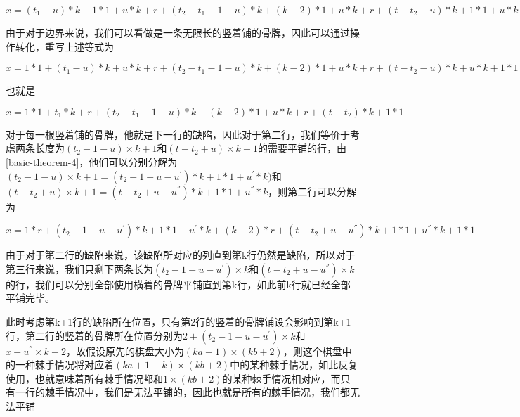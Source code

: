 $x = (t_1 - u) * k  + 1 * 1 + u * k + r +  (t_2 - t_1 - 1 - u) * k  + (k - 2) * 1 + u * k + r + (t - t_2 - u) * k  + 1 * 1 + u * k$

由于对于边界来说，我们可以看做是一条无限长的竖着铺的骨牌，因此可以通过操作转化，重写上述等式为

$x =  1 * 1 +  (t_1 - u) * k  + u * k + r +  (t_2 - t_1 - 1 - u) * k  + (k - 2) * 1 + u * k + r + (t - t_2 - u) * k  + u * k + 1 * 1$

也就是

$x =  1 * 1 +  t_1 * k + r +  (t_2 - t_1 - 1 - u) * k  + (k - 2) * 1 + u * k + r + (t - t_2) * k + 1 * 1$

对于每一根竖着铺的骨牌，他就是下一行的缺陷，因此对于第二行，我们等价于考虑两条长度为$(t_2- 1 - u) \times k + 1$和$(t - t_2 + u) \times k + 1$的需要平铺的行，由\ref*{basic-theorem-4}，他们可以分别分解为$(t_2- 1 - u) \times k + 1 = (t_2- 1 - u - u^{'}) * k + 1* 1 +  u^{'} * k)$和$(t - t_2 + u) \times k + 1 = (t - t_2 + u - u^{''}) * k + 1 * 1 +  u^{''} * k$，则第二行可以分解为

$x =  1 * r +  (t_2- 1 - u - u^{'}) * k + 1* 1 +  u^{'} * k  + (k - 2) * r + (t - t_2 + u - u^{''}) * k + 1 * 1 +  u^{''} * k + 1 * 1$

由于对于第二行的缺陷来说，该缺陷所对应的列直到第k行仍然是缺陷，所以对于第三行来说，我们只剩下两条长为$(t_2- 1 - u - u^{'}) \times k$和$(t - t_2 + u - u^{''}) \times k$的行，我们可以分别全部使用横着的骨牌平铺直到第k行，如此前k行就已经全部平铺完毕。

此时考虑第k+1行的缺陷所在位置，只有第2行的竖着的骨牌铺设会影响到第k+1行，第二行的竖着的骨牌所在位置分别为$2 + (t_2- 1 - u - u^{'}) \times k$和$x - u^{''} \times k - 2$，故假设原先的棋盘大小为$(ka+1) \times (kb + 2)$，则这个棋盘中的一种棘手情况将对应着$(ka+1 -k) \times (kb + 2)$中的某种棘手情况，如此反复使用，也就意味着所有棘手情况都和$1 \times (kb + 2)$的某种棘手情况相对应，而只有一行的棘手情况中，我们是无法平铺的，因此也就是所有的棘手情况，我们都无法平铺\cite{liu2011sift}

\clearpage